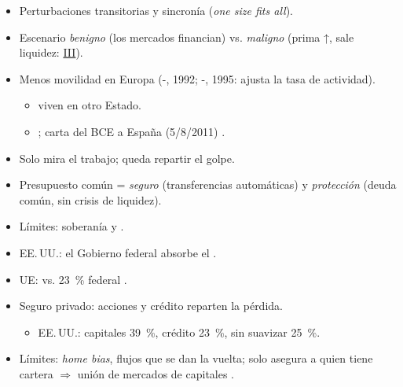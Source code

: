 \documentclass{article}
\begin{document}
\begin{columnas}
\begin{itemize}
\item Perturbaciones transitorias y sincronía (\emph{one size fits all}).
\item Escenario \emph{benigno} (los mercados financian) vs. \emph{maligno} (prima ↑, sale liquidez: \hyperref[rep:III]{III}).
\end{itemize}
\begin{itemize}
\item Menos movilidad en Europa (-, 1992; -, 1995: ajusta la tasa de actividad).
  \begin{itemize}
  \item {} viven en otro Estado.
  \item {}; carta del BCE a España (5/8/2011) .
  \end{itemize}
\item Solo mira el trabajo; queda repartir el golpe.
\end{itemize}

\begin{itemize}
\item Presupuesto común = \emph{seguro} (transferencias automáticas) y \emph{protección} (deuda común, sin crisis de liquidez).
\item Límites: soberanía y .
\item EE.\,UU.: el Gobierno federal absorbe el .
\item UE:  vs. 23~\% federal .
\end{itemize}

\begin{itemize}
\item Seguro privado: acciones y crédito reparten la pérdida.
  \begin{itemize}
  \item EE.\,UU.: capitales 39~\%, crédito 23~\%, sin suavizar 25~\%.
  \end{itemize}
\item Límites: \emph{home bias}, flujos que se dan la vuelta; solo asegura a quien tiene cartera $\Rightarrow$ unión de mercados de capitales .
\end{itemize}


\end{columnas}
\end{document}

